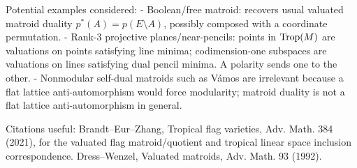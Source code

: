 \documentclass[12pt]{article}
\begin{document}
Potential examples considered:
- Boolean/free matroid: recovers usual valuated matroid duality
$p^*(A)=p(E\setminus A)$, possibly composed with a coordinate permutation.
- Rank-3 projective planes/near-pencils: points in $\operatorname{Trop}(M)$ are valuations on
points satisfying line minima; codimension-one subspaces are valuations on
lines satisfying dual pencil minima. A polarity sends one to the other.
- Nonmodular self-dual matroids such as V\'amos are irrelevant because a flat
lattice anti-automorphism would force modularity; matroid duality is not a flat
lattice anti-automorphism in general.

Citations useful:
Brandt--Eur--Zhang, Tropical flag varieties, Adv. Math. 384 (2021), for the
valuated flag matroid/quotient and tropical linear space inclusion
correspondence.
Dress--Wenzel, Valuated matroids, Adv. Math. 93 (1992).
\end{document}

